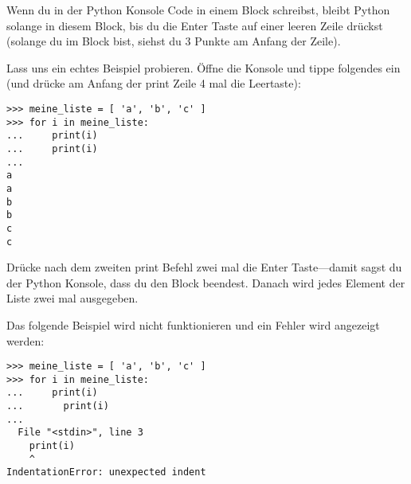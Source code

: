 Wenn du in der Python Konsole Code in einem Block schreibst, bleibt Python solange in diesem Block, bis du die Enter Taste auf einer leeren Zeile drückst (solange du im Block bist, siehst du 3 Punkte am Anfang der Zeile).

Lass uns ein echtes Beispiel probieren. Öffne die Konsole und tippe folgendes ein (und drücke am Anfang der print Zeile 4 mal die Leertaste):

\begin{listing}
\begin{verbatim}
>>> meine_liste = [ 'a', 'b', 'c' ]
>>> for i in meine_liste:
...     print(i)
...     print(i)
...
a
a
b
b
c
c
\end{verbatim}
\end{listing}

Drücke nach dem zweiten print Befehl zwei mal die Enter Taste---damit sagst du der Python Konsole, dass du den Block beendest. Danach wird jedes Element der Liste zwei mal ausgegeben. 
\par
\noindent
Das folgende Beispiel wird nicht funktionieren und ein Fehler wird angezeigt werden:

\begin{listing}
\begin{verbatim}
>>> meine_liste = [ 'a', 'b', 'c' ]
>>> for i in meine_liste:
...     print(i)
...       print(i)
...
  File "<stdin>", line 3
    print(i)
    ^
IndentationError: unexpected indent
\end{verbatim}
\end{listing}

